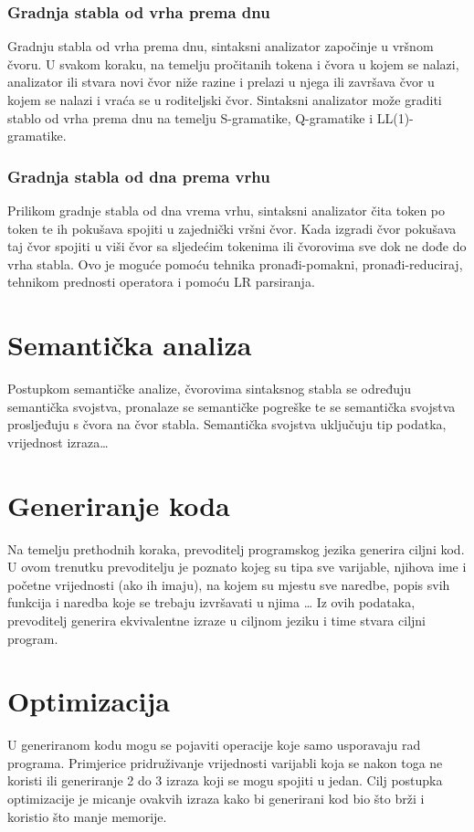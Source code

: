 \documentclass[times, utf8, zavrsni]{fer}
\begin{document}
\subsubsection{Gradnja stabla od vrha prema dnu}
Gradnju stabla od vrha prema dnu, sintaksni analizator započinje u vršnom čvoru. U svakom koraku, na temelju 
pročitanih tokena i čvora u kojem se nalazi, analizator ili stvara novi čvor niže razine i prelazi u njega ili završava čvor u kojem se nalazi
i vraća se u roditeljski čvor. Sintaksni analizator može graditi stablo od vrha prema dnu na temelju S-gramatike,
Q-gramatike i LL(1)-gramatike. \citep{ppj}

\subsubsection{Gradnja stabla od dna prema vrhu}
Prilikom gradnje stabla od dna vrema vrhu, sintaksni analizator čita token po token te ih pokušava spojiti u zajednički vršni čvor.
Kada izgradi čvor pokušava taj čvor spojiti u viši čvor sa sljedećim tokenima ili čvorovima sve dok ne dođe do vrha stabla.
Ovo je moguće pomoću tehnika pronađi-pomakni, pronađi-reduciraj, tehnikom prednosti operatora i pomoću LR parsiranja. \citep{ppj}

\section{Semantička analiza}
Postupkom semantičke analize, čvorovima sintaksnog stabla se određuju semantička svojstva, pronalaze se semantičke pogreške
te se semantička svojstva prosljeđuju \linebreak s čvora na čvor stabla. Semantička svojstva uključuju tip podatka, vrijednost izraza\dots \citep{ppj}

\section{Generiranje koda}
Na temelju prethodnih koraka, prevoditelj programskog jezika generira ciljni kod. U ovom trenutku prevoditelju je poznato
kojeg su tipa sve varijable, njihova ime i početne vrijednosti (ako ih imaju), na kojem su mjestu sve naredbe, popis svih funkcija i naredba koje se trebaju izvršavati u njima \dots
Iz ovih podataka, prevoditelj generira ekvivalentne izraze u ciljnom jeziku i time stvara ciljni program. \citep{ppj}

\section{Optimizacija}
U generiranom kodu mogu se pojaviti operacije koje samo usporavaju rad programa. Primjerice pridruživanje vrijednosti varijabli koja se nakon toga ne koristi
ili generiranje 2 do 3 izraza koji se mogu spojiti u jedan.
Cilj postupka optimizacije je micanje ovakvih izraza kako bi generirani kod bio što brži i koristio što manje memorije.
\end{document}
